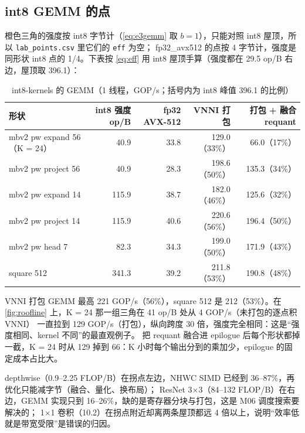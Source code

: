 \documentclass[11pt,a4paper]{ctexart}
\begin{document}
\subsection{int8 GEMM 的点}

橙色三角的强度按 int8 字节计（\cref{eq:e3gemm} 取 $b=1$），只能对照 int8 屋顶，所以 \texttt{lab\_points.csv} 里它们的 \texttt{eff} 为空；
fp32\_avx512 的点按 4 字节计，强度是同形状 int8 点的 1/4。下表按 \cref{eq:eff} 用 int8 屋顶手算（强度都在 29.5 op/B 右边，屋顶取 396.1）：

\begin{table}[H]
\centering\small
\caption{int8-kernels 的 GEMM（1 线程，GOP/s；括号内为 int8 峰值 396.1 的比例）}\label{tab:gemm}
\begin{tabular}{lrrrr}
\toprule
形状 & int8 强度 op/B & fp32 AVX-512 & VNNI 打包 & 打包 + 融合 requant \\
\midrule
mbv2 pw expand 56（K = 24） & 40.9 & 33.8 & 129.0（33\%） & 66.0（17\%） \\
mbv2 pw project 56 & 40.9 & 28.3 & 198.6（50\%） & 135.3（34\%） \\
mbv2 pw expand 14 & 115.9 & 38.7 & 182.0（46\%） & 125.6（32\%） \\
mbv2 pw project 14 & 115.9 & 40.6 & 220.6（56\%） & 196.4（50\%） \\
mbv2 pw head 7 & 82.3 & 34.3 & 199.0（50\%） & 171.9（43\%） \\
square 512 & 341.3 & 39.2 & 211.8（53\%） & 190.8（48\%） \\
\bottomrule
\end{tabular}
\end{table}

VNNI 打包 GEMM 最高 221 GOP/s（56\%），square 512 是 212（53\%）。在 \cref{fig:roofline} 上，K = 24 那一组三角在 41 op/B 处从 4 GOP/s（未打包的逐点积 VNNI）
一直拉到 129 GOP/s（打包），纵向跨度 30 倍，强度完全相同：这是“强度相同、kernel 不同”的最直观例子。
把 requant 融合进 epilogue 后每个形状都掉一截，K = 24 时从 129 掉到 66：K 小时每个输出分到的乘加少，epilogue 的固定成本占比大。

\begin{findingbox}
depthwise（0.9--2.25 FLOP/B）在拐点左边，NHWC SIMD 已经到 36--87\%，再优化只能减字节（融合、量化、换布局）；
ResNet 3×3（84--132 FLOP/B）在右边，GEMM 实现只到 16--26\%，缺的是寄存器分块与打包，这是 M06 调度搜索要解决的；
1×1 卷积（10.2）在拐点附近却离两条屋顶都远 4 倍以上，说明“效率低就是带宽受限”是错误的归因。
\end{findingbox}
\end{document}

